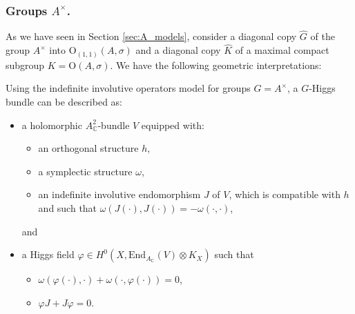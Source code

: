\documentclass[oneside,11pt]{amsart}
\theoremstyle{definition}
\theoremstyle{remark}
\numberwithin{thm}{section}
\numberwithin{equation}{section}
\begin{document}
\subsubsection{Groups $A^{\times}$.}

As we have seen in Section \ref{sec:A_models}, consider a diagonal copy $\hat{G}$ of the group $A^{\times}$ into $\mathrm{O}_{(1,1)}(A,\sigma)$ and a diagonal copy $\hat{K}$ of a maximal compact subgroup $K=\mathrm{O}(A,\sigma)$. We have the following geometric interpretations:

Using the indefinite involutive operators model for groups $G=A^{\times}$, a $G$-Higgs bundle can be described as: 
\begin{itemize}
    \item a holomorphic $A^2_{\mathbb{C}}$-bundle $V$ equipped with: 
    \begin{itemize}
        \item an orthogonal structure $h$,
        \item a symplectic structure $\omega$,
        \item an indefinite involutive endomorphism $J$ of $V$, which is compatible with $h$ and such that $\omega(J(\cdot),J(\cdot))=-\omega(\cdot,\cdot)$,
    \end{itemize}
    and
    \item a Higgs field $\varphi\in H^0(X,\mathrm{End}_{A_\mathbb C}(V)\otimes K_X)$ such that 
    \begin{itemize}
        \item $\omega(\varphi(\cdot),\cdot)+\omega(\cdot,\varphi(\cdot))=0$, 
        \item $\varphi J+J\varphi=0$.
        \end{itemize}
\end{itemize}
\end{document}
